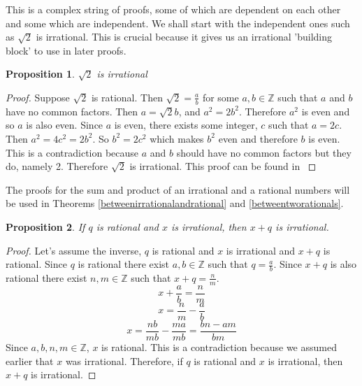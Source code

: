 \documentclass{article}
\newtheorem{prop}{Proposition}
\begin{document}
\vspace{5mm}

This is a complex string of proofs, some of which are dependent on each other and some which are independent. We shall start with the independent ones such as $\sqrt{2}$ is irrational. This is crucial because it gives us an irrational 'building block' to use in later proofs.

\vspace{5mm}

\begin{prop}\label{sqrt2}
$\sqrt{2}$ is irrational
\end{prop}
\begin{proof}
Suppose $\sqrt{2}$ is rational. Then $\sqrt{2}=\frac{a}{b}$ for some $a,b\in\mathbb{Z}$ such that $a$ and $b$ have no common factors. Then $a=\sqrt{2}b$, and $a^2=2b^2$. Therefore $a^2$ is even and so $a$ is also even. Since $a$ is even, there exists some integer, $c$ such that $a=2c$. Then $a^2=4c^2=2b^2$. So $b^2=2c^2$ which makes $b^2$ even and therefore $b$ is even. This is a contradiction because $a$ and $b$ should have no common factors but they do, namely 2. Therefore $\sqrt{2}$ is irrational. This proof can be found in \cite{hammack}
\end{proof}

\vspace{5mm}

The proofs for the sum and product of an irrational and a rational numbers will be used in Theorems \ref{betweenirrationalandrational} and \ref{betweentworationals}.

\vspace{5mm}

\begin{prop} \label{rationalsum}
If $q$ is rational and $x$ is irrational, then $x+q$ is irrational.
\end{prop}
\begin{proof}
Let's assume the inverse, $q$ is rational and $x$ is irrational and $x+q$ is rational. Since $q$ is rational there exist $a,b\in\mathbb{Z}$ such that $q=\frac{a}{b}$. Since $x+q$ is also rational there exist $n,m\in\mathbb{Z}$ such that $x+q=\frac{n}{m}$.
$$x+\frac{a}{b}=\frac{n}{m}$$
$$x=\frac{n}{m}-\frac{a}{b}$$
$$x=\frac{nb}{mb}-\frac{ma}{mb}=\frac{bn-am}{bm}$$
Since $a,b,n,m\in\mathbb{Z}$, $x$ is rational. This is a contradiction because we assumed earlier that $x$ was irrational.
Therefore, if $q$ is rational and $x$ is irrational, then $x+q$ is irrational.
\end{proof}
\end{document}
